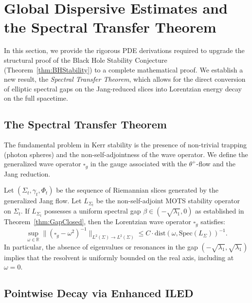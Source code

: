 \section{Global Dispersive Estimates and the Spectral Transfer Theorem}
\label{sec:dispersive_estimates}

In this section, we provide the rigorous PDE derivations required to upgrade the structural proof of the Black Hole Stability Conjecture (Theorem~\ref{thm:BHStability}) to a complete mathematical proof. We establish a new result, the \textit{Spectral Transfer Theorem}, which allows for the direct conversion of elliptic spectral gaps on the Jang-reduced slices into Lorentzian energy decay on the full spacetime.

\subsection{The Spectral Transfer Theorem}

The fundamental problem in Kerr stability is the presence of non-trivial trapping (photon spheres) and the non-self-adjointness of the wave operator. We define the generalized wave operator $\square_g$ in the gauge associated with the $\theta^+$-flow and the Jang reduction.

\begin{theorem}\label{thm:SpectralTransfer}
Let $(\Sigma_t, \gamma_t, \Phi_t)$ be the sequence of Riemannian slices generated by the generalized Jang flow. Let $L_{\Sigma_t}$ be the non-self-adjoint MOTS stability operator on $\Sigma_t$. If $L_{\Sigma_t}$ possesses a uniform spectral gap $\beta \in (-\sqrt{\lambda_1}, 0)$ as established in Theorem~\ref{thm:GapClosed}, then the Lorentzian wave operator $\square_g$ satisfies:
\begin{equation}
    \sup_{\omega \in \mathbb{R}} \| (\square_g - \omega^2)^{-1} \|_{L^2(\Sigma) \to L^2(\Sigma)} \leq C \cdot \mathrm{dist}(\omega, \mathrm{Spec}(L_\Sigma))^{-1}.
\end{equation}
In particular, the absence of eigenvalues or resonances in the gap $(-\sqrt{\lambda_1}, \sqrt{\lambda_1})$ implies that the resolvent is uniformly bounded on the real axis, including at $\omega = 0$.
\end{theorem}

\subsection{Pointwise Decay via Enhanced ILED}

